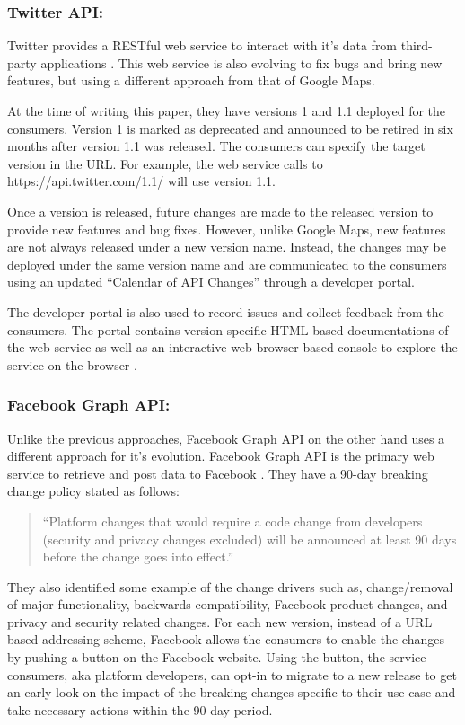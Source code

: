 \documentclass[runningheads,a4paper]{llncs}
\begin{document}
\subsubsection{Twitter API:}
Twitter provides a RESTful web service to interact with it’s data from third-party applications \cite{twitter_api}. This web service is also evolving to fix bugs and bring new features, but using a different approach from that of Google Maps.

At the time of writing this paper, they have versions 1 and 1.1 deployed for the consumers. Version 1 is marked as deprecated and announced to be retired in six months after version 1.1 was released. The consumers can specify the target version in the URL. For example, the web service calls to https://api.twitter.com/1.1/ will use version 1.1.

Once a version is released, future changes are made to the released version to provide new features and bug fixes. However, unlike Google Maps, new features are not always released under a new version name. Instead, the changes may be deployed under the same version name and are communicated to the consumers using an updated “Calendar of API Changes” \cite{twitter_calendar} through a developer portal.

The developer portal is also used to record issues and collect feedback from the consumers. The portal contains version specific HTML based documentations of the web service as well as an interactive web browser based console to explore the service on the browser \cite{twitter_console} .

\subsubsection{Facebook Graph API:}

Unlike the previous approaches, Facebook Graph API on the other hand uses a different approach for it’s evolution. Facebook Graph API is the primary web service to retrieve and post data to Facebook \cite{facebook_api}. They have a 90-day breaking change policy stated as follows:

\begin{quote}
``Platform changes that would require a code change from developers (security and privacy changes excluded) will be announced at least 90 days before the change goes into effect.''
\end{quote}

They also identified some example of the change drivers such as, change/removal of major functionality, backwards compatibility, Facebook product changes, and privacy and security related changes. For each new version, instead of a URL based addressing scheme, Facebook allows the consumers to enable the changes by pushing a button on the Facebook website. Using the button, the service consumers, aka platform developers, can opt-in to migrate to a new release to get an early look on the impact of the breaking changes specific to their use case and take necessary actions within the 90-day period.
\end{document}
